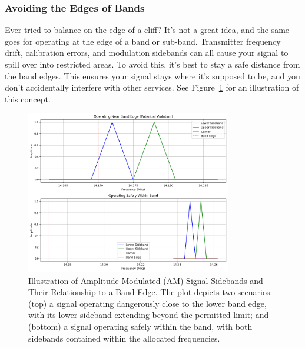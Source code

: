 \subsubsection*{Avoiding the Edges of Bands}
Ever tried to balance on the edge of a cliff? It’s not a great idea, and the same goes for operating at the edge of a band or sub-band. Transmitter frequency drift, calibration errors, and modulation sidebands can all cause your signal to spill over into restricted areas. To avoid this, it’s best to stay a safe distance from the band edges. This ensures your signal stays where it’s supposed to be, and you don’t accidentally interfere with other services. See Figure~\ref{fig:sidebands} for an illustration of this concept.


\begin{figure}[htbp]
    \centering
    \includegraphics[width=0.8\textwidth]{images/sideband_edge.png}
    \caption{Illustration of Amplitude Modulated (AM) Signal Sidebands and Their Relationship to a Band Edge. The plot depicts two scenarios: (top) a signal operating dangerously close to the lower band edge, with its lower sideband extending beyond the permitted limit; and (bottom) a signal operating safely within the band, with both sidebands contained within the allocated frequencies.}
    \label{fig:sidebands}
\end{figure}


